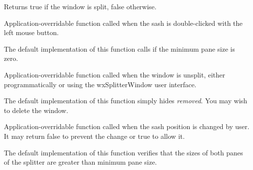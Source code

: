 Returns true if the window is split, false otherwise.

\label{wxsplitterwindowondoubleclicksash}


Application-overridable function called when the sash is double-clicked with
the left mouse button.





The default implementation of this function calls  if
the minimum pane size is zero.



\label{wxsplitterwindowonunsplit}


Application-overridable function called when the window is unsplit, either
programmatically or using the wxSplitterWindow user interface.




The default implementation of this function simply hides {\it removed}. You
may wish to delete the window.

\label{wxsplitterwindowonsashpositionchange}


Application-overridable function called when the sash position is changed by 
user. It may return false to prevent the change or true to allow it.




The default implementation of this function verifies that the sizes of both 
panes of the splitter are greater than minimum pane size.

